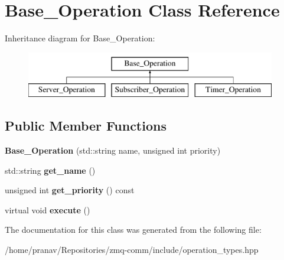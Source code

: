 \hypertarget{classBase__Operation}{}\section{Base\+\_\+\+Operation Class Reference}
\label{classBase__Operation}
Inheritance diagram for Base\+\_\+\+Operation\+:\begin{figure}[H]
\begin{center}
\leavevmode
\includegraphics[height=2.000000cm]{classBase__Operation}
\end{center}
\end{figure}
\subsection*{Public Member Functions}
\begin{DoxyCompactItemize}
\item 
{\bfseries Base\+\_\+\+Operation} (std\+::string name, unsigned int priority)\hypertarget{classBase__Operation_a304b48dd7ee48e1010acb5e08cf9bfdf}{}\label{classBase__Operation_a304b48dd7ee48e1010acb5e08cf9bfdf}

\item 
std\+::string {\bfseries get\+\_\+name} ()\hypertarget{classBase__Operation_a878dd0e855a78907e4c828b1d70587d0}{}\label{classBase__Operation_a878dd0e855a78907e4c828b1d70587d0}

\item 
unsigned int {\bfseries get\+\_\+priority} () const \hypertarget{classBase__Operation_a0d561f85d2454f7c5abbe9d0e264a98a}{}\label{classBase__Operation_a0d561f85d2454f7c5abbe9d0e264a98a}

\item 
virtual void {\bfseries execute} ()\hypertarget{classBase__Operation_a79b95449af5927c70e5e243b36a5e250}{}\label{classBase__Operation_a79b95449af5927c70e5e243b36a5e250}

\end{DoxyCompactItemize}


The documentation for this class was generated from the following file\+:\begin{DoxyCompactItemize}
\item 
/home/pranav/\+Repositories/zmq-\/comm/include/operation\+\_\+types.\+hpp\end{DoxyCompactItemize}
